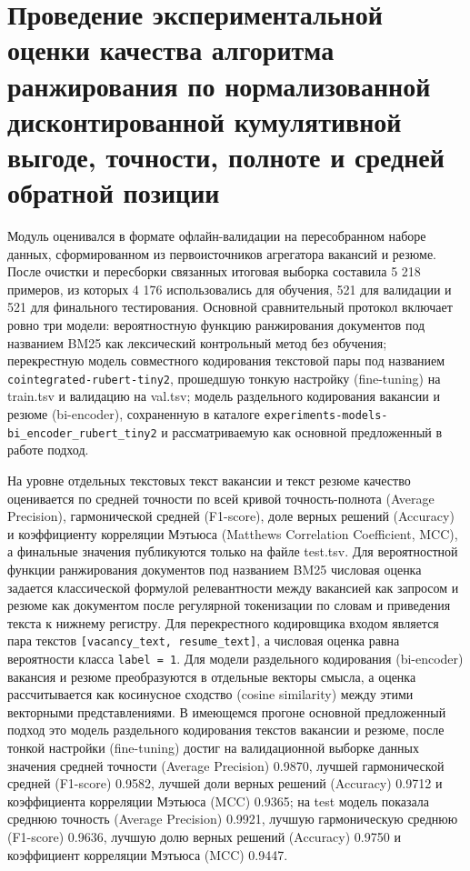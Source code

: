 \section{Проведение экспериментальной оценки качества алгоритма ранжирования по нормализованной дисконтированной кумулятивной выгоде, точности, полноте и средней обратной позиции}

Модуль оценивался в формате офлайн-валидации на пересобранном наборе данных, сформированном из первоисточников агрегатора вакансий и резюме. После очистки и пересборки связанных итоговая выборка составила 5 218 примеров, из которых 4 176 использовались для обучения, 521 для валидации и 521 для финального тестирования. Основной сравнительный протокол включает ровно три модели: вероятностную функцию ранжирования документов под названием BM25 как лексический контрольный метод без обучения; перекрестную модель совместного кодирования текстовой пары под названием \texttt{cointegrated-rubert-tiny2}, прошедшую тонкую настройку (fine-tuning) на train.tsv и валидацию на val.tsv; модель раздельного кодирования вакансии и резюме (bi-encoder), сохраненную в каталоге \texttt{experiments-models-bi\_encoder\_rubert\_tiny2} и рассматриваемую как основной предложенный в работе подход.

На уровне отдельных текстовых текст вакансии и текст резюме качество оценивается по средней точности по всей кривой точность-полнота (Average Precision), гармонической средней (F1-score), доле верных решений (Accuracy) и коэффициенту корреляции Мэтьюса (Matthews Correlation Coefficient, MCC), а финальные значения публикуются только на файле test.tsv. Для вероятностной функции ранжирования документов под названием BM25 числовая оценка задается классической формулой релевантности между вакансией как запросом и резюме как документом после регулярной токенизации по словам и приведения текста к нижнему регистру. Для перекрестного кодировщика входом является пара текстов \texttt{{[}vacancy\_text, resume\_text{]}}, а числовая оценка равна вероятности класса \texttt{label = 1}. Для модели раздельного кодирования (bi-encoder) вакансия и резюме преобразуются в отдельные векторы смысла, а оценка рассчитывается как косинусное сходство (cosine similarity) между этими векторными представлениями. В имеющемся прогоне основной предложенный подход это модель раздельного кодирования текстов вакансии и резюме, после тонкой настройки (fine-tuning) достиг на валидационной выборке данных значения средней точности (Average Precision) 0.9870, лучшей гармонической средней (F1-score) 0.9582, лучшей доли верных решений (Accuracy) 0.9712 и коэффициента корреляции Мэтьюса (MCC) 0.9365; на test модель показала среднюю точность (Average Precision) 0.9921, лучшую гармоническую среднюю (F1-score) 0.9636, лучшую долю верных решений (Accuracy) 0.9750 и коэффициент корреляции Мэтьюса (MCC) 0.9447.

